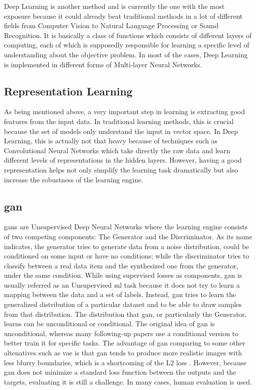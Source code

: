 Deep Learning is another method and is currently the one with the most exposure because it
could already beat traditional methods in a lot of different fields from Computer Vision
to Natural Language Processing or Sound Recognition. It is basically a class of functions
which consists of different layers of computing, each of which is supposedly responsible
for learning a specific level of understanding about the objective problem. In most of the
cases, Deep Learning is implemented in different forms of Multi-layer Neural Networks.

\subsection{Representation Learning}
As being mentioned above, a very important step in learning is extracting good features
from the input data. In traditional learning methods, this is crucial because the set of
models only understand the input in vector space. In Deep Learning, this is actually not
that heavy because of techniques such as Convolutional Neural Networks which take directly
the raw data and learn different levels of representations in the hidden layers. However,
having a good representation helps not only simplify the learning task dramatically but
also increase the robustness of the learning engine.

\subsection{\acrfull{gan}}
\acrlong{gan}s \cite{gan} are Unsupervised Deep Neural Networks where the learning
engine consists of two competing components: The Generator and the Discriminator. As its
name indicates, the generator tries to generate data from a noise distribution, could be
conditioned on some input or have no conditions; while the discriminator tries to classify
between a real data item and the synthesized one from the generator, under the same
condition. While using supervised losses as components, \acrshort{gan} is usually referred
as an Unsupervised \acrshort{ml} task because it does not try to learn a mapping between
the data and a set of labels. Instead, \acrshort{gan} tries to learn the generalized
distribution of a particular dataset and to be able to draw samples from that
distribution. The distribution that \acrshort{gan}, or particularly the Generator, learns
can be unconditional or conditional. The original idea of \acrshort{gan} is unconditional,
whereas many following-up papers use a conditional version to better train it for specific
tasks. The advantage of \acrshort{gan} comparing to some other altenatives such as
\acrfull{vae} \cite{vae} is that \acrshort{gan} tends to produce more realistic images with less
blurry boundaries, which is a shortcoming of the L2 loss \cite{gan}.
However, because \acrshort{gan} does not minimize a standard loss function between the
outputs and the targets, evaluating it is still a challenge. In many cases, human
evaluation is used.

